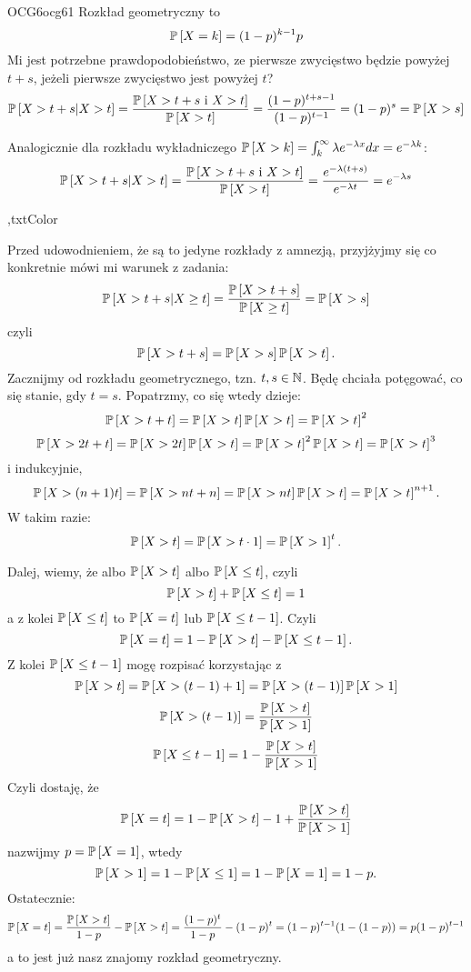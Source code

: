 \documentclass{article}
\begin{document}


\begin{ocg}{OCG6}{ocg6}{1}
Rozkład geometryczny to
$$\prob{X=k}=(1-p)^{k-1}p$$
Mi jest potrzebne prawdopodobieństwo, ze pierwsze zwycięstwo będzie powyżej $t+s$, jeżeli pierwsze zwycięstwo jest powyżej $t$?
\begin{align*}
    \prob{X>t+s|X> t}=\frac{\prob{X>t+s\text{ i }X> t}}{\prob{X>t}}=\frac{(1-p)^{t+s-1}}{(1-p)^{t-1}}=(1-p)^{s}=\prob{X>s}
\end{align*}

Analogicznie dla rozkładu wykładniczego $\prob{X>k}=\int_k^\infty\lambda e^{-\lambda x}dx=e^{-\lambda k}$:
\begin{align*}
    \prob{X>t+s|X> t}=\frac{\prob{X>t+s\text{ i }X> t}}{\prob{X>t}}=\frac{e^{-\lambda(t+s)}}{ e^{-\lambda t}}=e^{-\lambda s}
\end{align*}

\sep{txtColor}

Przed udowodnieniem, że są to jedyne rozkłady z amnezją, przyjżyjmy się co konkretnie mówi mi warunek z zadania:
$$\prob{X>t+s|X\geq t}=\frac{\prob{X>t+s}}{\prob{X\geq t}}=\prob{X>s}$$
czyli
$$\prob{X>t+s}=\prob{X>s}\prob{X> t}.$$
Zacznijmy od rozkładu geometrycznego, tzn. $t,s\in\mathbb{N}$. Będę chciała potęgować, co się stanie, gdy $t=s$. Popatrzmy, co się wtedy dzieje:
$$\prob{X>t+t}=\prob{X>t}\prob{X> t}=\prob{X>t}^2$$
$$\prob{X>2t+t}=\prob{X>2t}\prob{X>t}=\prob{X>t}^2\prob{X>t}=\prob{X>t}^3$$
i indukcyjnie,
$$\prob{X>(n+1)t}=\prob{X>nt+n}=\prob{X>nt}\prob{X>t}=\prob{X>t}^{n+1}.$$
W takim razie:
$$\prob{X>t}=\prob{X>t\cdot1}=\prob{X>1}^t.$$

Dalej, wiemy, że albo $\prob{X>t}$ albo $\prob{X\leq t}$, czyli
$$\prob{X>t}+\prob{X\leq t}=1$$
a z kolei $\prob{X\leq t}$ to $\prob{X=t}$ lub $\prob{X\leq t-1}$. Czyli
$$\prob{X=t}=1-\prob{X>t}-\prob{X\leq t-1}.$$
Z kolei $\prob{X\leq t-1}$ mogę rozpisać korzystając z 
$$\prob{X>t}=\prob{X>(t-1)+1}=\prob{X>(t-1)}\prob{X>1}$$
$$\prob{X>(t-1)}=\frac{\prob{X>t}}{\prob{X>1}}$$
$$\prob{X\leq t-1}=1-\frac{\prob{X>t}}{\prob{X>1}}$$
Czyli dostaję, że
$$\prob{X=t}=1-\prob{X>t}-1+\frac{\prob{X>t}}{\prob{X>1}}$$
nazwijmy $p=\prob{X=1}$, wtedy 
$$\prob{X>1}=1-\prob{X\leq 1}=1-\prob{X=1}=1-p.$$
Ostatecznie:
$$\prob{X=t}=\frac{\prob{X>t}}{1-p}-\prob{X>t}=\frac{(1-p)^t}{1-p}-(1-p)^t=(1-p)^{t-1}(1-(1-p))=p(1-p)^{t-1}$$
a to jest już nasz znajomy rozkład geometryczny.
\medskip


\end{ocg}
\end{document}
